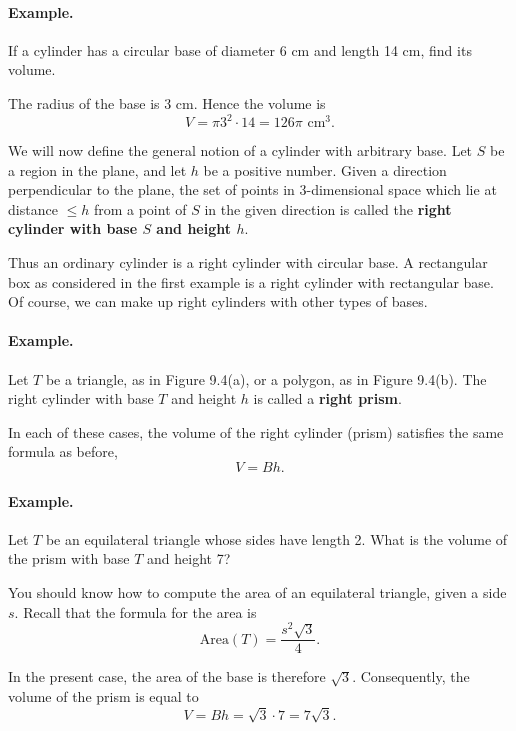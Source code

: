 \documentclass[12pt]{book} %
\begin{document}

\paragraph{Example.}
If a cylinder has a circular base of diameter 6 cm and length 14 cm, find its volume.


The radius of the base is 3 cm. Hence the volume is
\[
V=\pi 3^2\cdot 14=126\pi\text{ cm}^3.
\]

We will now define the general notion of a cylinder with arbitrary base. Let $S$ be a region in the plane, and let $h$ be a positive number. Given a direction perpendicular to the plane, the set of points in 3-dimensional space which lie at distance $\le h$ from a point of $S$ in the given direction is called the \textbf{right cylinder with base $S$ and height $h$}.

Thus an ordinary cylinder is a right cylinder with circular base. A rectangular box as considered in the first example is a right cylinder with rectangular base. Of course, we can make up right cylinders with other types of bases.

\paragraph{Example.}
Let $T$ be a triangle, as in Figure 9.4(a), or a polygon, as in Figure 9.4(b). The right cylinder with base $T$ and height $h$ is called a \textbf{right prism}.


In each of these cases, the volume of the right cylinder (prism) satisfies the same formula as before,
\[
V=Bh.
\]

\paragraph{Example.}
Let $T$ be an equilateral triangle whose sides have length 2. What is the volume of the prism with base $T$ and height 7?

You should know how to compute the area of an equilateral triangle, given a side $s$. Recall that the formula for the area is
\[
\text{Area}(T)=\frac{s^2\sqrt{3}}{4}.
\]

In the present case, the area of the base is therefore $\sqrt{3}$. Consequently, the volume of the prism is equal to
\[
V=Bh=\sqrt{3}\cdot 7=7\sqrt{3}.
\]
\end{document}
